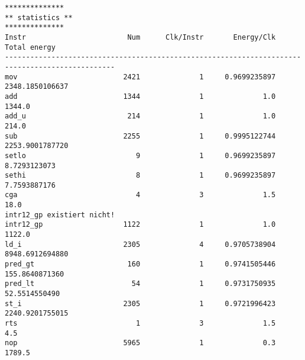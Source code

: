 \documentclass[oneside,11pt,accentcolor=tud2b, nochapname]{tudexercise}
\begin{document}
\begin{lstlisting}[caption={Endausgabe für das Ziel Energy-Min (Instanz 6x6++) },captionpos=b, float, label={lst:energy}]
**************
** statistics **
**************
Instr          	             Num	  Clk/Instr	      Energy/Clk	    Total energy	
------------------------------------------------------------------------------------------------
mov            	            2421	          1	    0.9699235897	 2348.1850106637	
add            	            1344	          1	             1.0	          1344.0	
add_u          	             214	          1	             1.0	           214.0	
sub            	            2255	          1	    0.9995122744	 2253.9001787720	
setlo          	               9	          1	    0.9699235897	    8.7293123073	
sethi          	               8	          1	    0.9699235897	    7.7593887176	
cga            	               4	          3	             1.5	            18.0	
intr12_gp existiert nicht!
intr12_gp      	            1122	          1	             1.0	          1122.0	
ld_i           	            2305	          4	    0.9705738904	 8948.6912694880	
pred_gt        	             160	          1	    0.9741505446	  155.8640871360	
pred_lt        	              54	          1	    0.9731750935	   52.5514550490	
st_i           	            2305	          1	    0.9721996423	 2240.9201755015	
rts            	               1	          3	             1.5	             4.5	
nop            	            5965	          1	             0.3	          1789.5	




\end{lstlisting}
\end{document}
